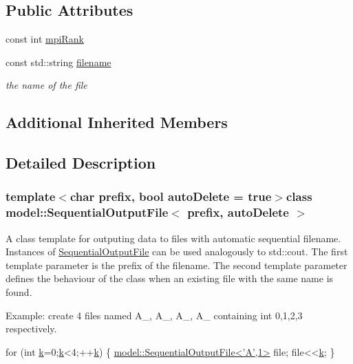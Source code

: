 \subsection*{Public Attributes}
\begin{DoxyCompactItemize}
\item 
const int \hyperlink{classmodel_1_1_sequential_output_file_a64750e7b97623991408225aabaef179f}{mpi\+Rank}
\item 
const std\+::string \hyperlink{classmodel_1_1_sequential_output_file_a9acc4f5dff4bc41b078b4f4d96b39848}{filename}
\begin{DoxyCompactList}\small\item\em the name of the file \end{DoxyCompactList}\end{DoxyCompactItemize}
\subsection*{Additional Inherited Members}


\subsection{Detailed Description}
\subsubsection*{template$<$char prefix, bool auto\+Delete = true$>$class model\+::\+Sequential\+Output\+File$<$ prefix, auto\+Delete $>$}

A class template for outputing data to files with automatic sequential filename. Instances of \hyperlink{classmodel_1_1_sequential_output_file}{Sequential\+Output\+File} can be used analogously to std\+::cout. The first template parameter is the prefix of the filename. The second template parameter defines the behaviour of the class when an existing file with the same name is found. 

Example\+: create 4 files named A\+\_, A\+\_, A\+\_, A\+\_ containing int 0,1,2,3 respectively. 
\begin{DoxyCode}
\textcolor{keywordflow}{for} (\textcolor{keywordtype}{int} \hyperlink{run_multipole_8m_a1c73327b2882639bc9f5e416bb3cc7ac}{k}=0;\hyperlink{run_multipole_8m_a1c73327b2882639bc9f5e416bb3cc7ac}{k}<4;++\hyperlink{run_multipole_8m_a1c73327b2882639bc9f5e416bb3cc7ac}{k})
\{
   \hyperlink{classmodel_1_1_sequential_output_file}{model::SequentialOutputFile<'A',1>} file;
   file<<\hyperlink{run_multipole_8m_a1c73327b2882639bc9f5e416bb3cc7ac}{k};
\}
\end{DoxyCode}
 

